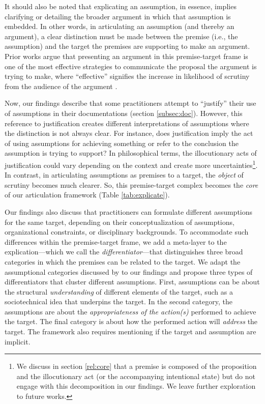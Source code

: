 It should also be noted that explicating an assumption, in essence, implies clarifying or detailing the broader argument in which that assumption is embedded. In other words, in articulating an assumption (and thereby an argument), a clear distinction must be made between the premise (i.e., the assumption) and the target the premises are supporting to make an argument. Prior works argue that presenting an argument in this premise-target frame is one of the most effective strategies to communicate the proposal the argument is trying to make, where ``effective'' signifies the increase in likelihood of scrutiny from the audience of the argument \cite{innocenti2021constructing,kauffeld1998presumptions,jacobs2000rhetoric}.

Now, our findings describe that some practitioners attempt to ``justify'' their use of assumptions in their documentations (section \ref{subsec:doc}).
However, this reference to justification creates different interpretations of assumptions where the distinction is not always clear.
For instance, does justification imply the act of using assumptions for achieving something or refer to the conclusion the assumption is trying to support?
In philosophical terms, the illocutionary acts of justification could vary depending on the context and create more uncertainties\footnote{We discuss in section \ref{rel:core} that a premise is composed of the proposition and the illocutionary act (or the accompanying intentional state) but do not engage with this decomposition in our findings. We leave further exploration to future works.}.
In contrast, in articulating assumptions as premises to a target, the \textit{object} of scrutiny becomes much clearer. So, this premise-target complex becomes the \textit{core} of our articulation framework (Table \ref{tab:explicate}).

Our findings also discuss that practitioners can formulate different assumptions for the same target, depending on their conceptualization of assumptions, organizational constraints, or disciplinary backgrounds.
To accommodate such differences within the premise-target frame, we add a meta-layer to the explication---which we call the \textit{differentiator}---that distinguishes three broad categories in which the premises can be related to the target. 
We adapt the assumptional categories discussed by \citet{brookfield1995getting} to our findings and propose three types of differentiators that cluster different assumptions.
First, assumptions can be about the structural \textit{understanding} of different elements of the target, such as a sociotechnical idea that underpins the target.
In the second category, the assumptions are about the \textit{appropriateness of the action(s)} performed to achieve the target. 
The final category is about how the performed action will \textit{address} the target.  
The framework also requires mentioning if the target and assumption are implicit. 


